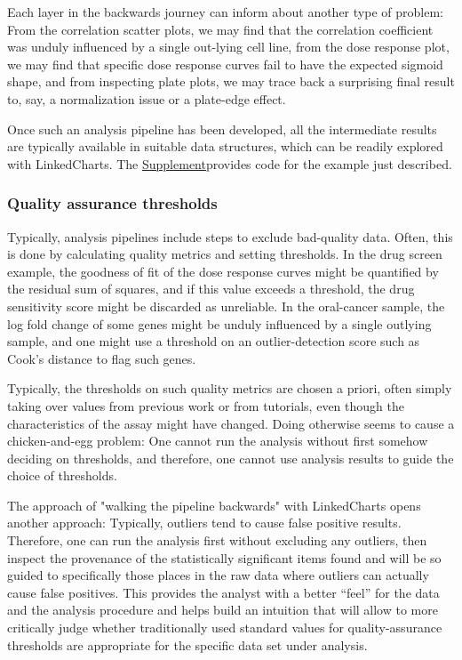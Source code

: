 \documentclass[twocolumn,10pt]{article}
\newcommand{\Supplement}{\href{https://anders-biostat.github.io/lc-paper/}{Supplement}}
\begin{document}
Each layer in the backwards journey can inform about another type of problem: From the correlation scatter plots, we may find that the correlation coefficient was unduly influenced by a single out-lying cell line, from the dose response plot, we may find that specific dose response curves fail to have the expected sigmoid shape, and from inspecting plate plots, we may trace back a surprising final result to, say, a normalization issue or a plate-edge effect.

Once such an analysis pipeline has been developed, all the intermediate results are typically available in suitable data structures, which can be readily explored with LinkedCharts. The \Supplement provides code for the example just described.

\subsubsection{Quality assurance thresholds}

Typically, analysis pipelines include steps to exclude bad-quality data. Often, this is done by calculating quality metrics and setting thresholds. In the drug screen example, the goodness of fit of the dose response curves might be quantified by the residual sum of squares, and if this value exceeds a threshold, the drug sensitivity score might be discarded as unreliable. In the oral-cancer sample, the log fold change of some genes might be unduly influenced by a single outlying sample, and one might use a threshold on an outlier-detection score such as Cook's distance to flag such genes.

Typically, the thresholds on such quality metrics are chosen a priori, often simply taking over values from previous work or from tutorials, even though the characteristics of the assay might have changed. Doing otherwise seems to cause a chicken-and-egg problem: One cannot run the analysis without first somehow deciding on thresholds, and therefore, one cannot use analysis results to guide the choice of thresholds.

The approach of "walking the pipeline backwards" with LinkedCharts opens another approach: Typically, outliers tend to cause false positive results. Therefore, one can run the analysis first without excluding any outliers, then inspect the provenance of the statistically significant items found and will be so guided to specifically those places in the raw data where outliers can actually cause false positives. This provides the analyst with a better ``feel'' for the data and the analysis procedure and helps build an intuition that will allow to more critically judge whether traditionally used standard values for quality-assurance thresholds are appropriate for the specific data set under analysis. 
\end{document}
